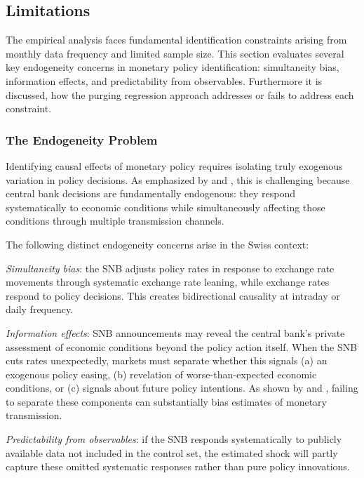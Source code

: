 \documentclass[12pt,a4paper]{article}
\begin{document}
\subsection{Limitations}
\label{subsec:limitations}
The empirical analysis faces fundamental identification constraints arising from monthly data frequency and limited sample size. This section evaluates several key endogeneity concerns in monetary policy identification: simultaneity bias, information effects, and predictability from observables. Furthermore it is discussed, how the purging regression approach addresses or fails to address each constraint.

\subsubsection{The Endogeneity Problem}
Identifying causal effects of monetary policy requires isolating truly exogenous variation in policy decisions. As emphasized by \citet{nakamura2018} and \citet{miranda2019}, this is challenging because central bank decisions are fundamentally endogenous: they respond systematically to economic conditions while simultaneously affecting those conditions through multiple transmission channels.

The following distinct endogeneity concerns arise in the Swiss context:

\textit{Simultaneity bias}: the SNB adjusts policy rates in response to exchange rate movements through systematic exchange rate leaning, while exchange rates respond to policy decisions. This creates bidirectional causality at intraday or daily frequency.

\textit{Information effects}: SNB announcements may reveal the central bank's private assessment of economic conditions beyond the policy action itself. When the SNB cuts rates unexpectedly, markets must separate whether this signals (a) an exogenous policy easing, (b) revelation of worse-than-expected economic conditions, or (c) signals about future policy intentions. As shown by \citet{jarocinski2020} and \citet{cieslak2019}, failing to separate these components can substantially bias estimates of monetary transmission. 

\textit{Predictability from observables}: if the SNB responds systematically to publicly available data not included in the control set, the estimated shock will partly capture these omitted systematic responses rather than pure policy innovations. 
\end{document}

